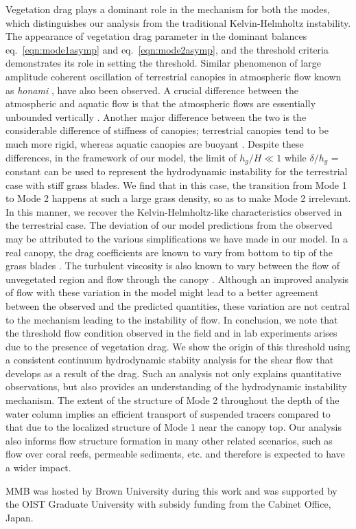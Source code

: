 \documentclass[aps,prl,twocolumn,superscriptaddress,10pt]{revtex4-1}  %
\newcommand{\hg}{h_g}
\begin{document}
Vegetation drag plays a dominant role in the mechanism for both the modes, which distinguishes our analysis from the traditional Kelvin-Helmholtz instability. 
The appearance of vegetation drag parameter in the dominant balances eq.~\eqref{eqn:mode1asymp} and eq.~\eqref{eqn:mode2asymp}, and the threshold criteria demonstrates its role in setting the threshold.
\newline
Similar phenomenon of large amplitude coherent oscillation of terrestrial canopies in atmospheric flow known as \textit{honami} \cite{Inoue56,Raupach96}, have also been observed.
A crucial difference between the atmospheric and aquatic flow is that the atmospheric flows are essentially unbounded vertically \cite{Vivoni98,Nepf00}. 
Another major difference between the two is the considerable difference of stiffness of canopies; terrestrial canopies tend to be much more rigid, whereas aquatic canopies are buoyant \cite{Vivoni98,Ghisal02}. 
Despite these differences, in the framework of our model, the limit of $\hg/H \ll 1$ while $\delta/\hg$ = constant can be used to represent the hydrodynamic instability for the terrestrial case with stiff grass blades. We find that in this case, the transition from Mode 1 to Mode 2 happens at such a large grass density, so as to make Mode 2 irrelevant. In this manner, we recover the Kelvin-Helmholtz-like characteristics observed in the terrestrial case. 
\newline
The deviation of our model predictions from the observed may be attributed to the various simplifications we have made in our model. 
In a real canopy, the drag coefficients are known to vary from bottom to tip of the grass blades \cite{Vivoni98,Nepf00}. 
The turbulent viscosity is also known to vary between the flow of unvegetated region and flow through the canopy \cite{Ghisal02}. 
Although an improved analysis of flow with these variation in the model might lead to a better agreement between the observed and the predicted quantities, these variation are not central to the mechanism leading to the instability of flow.
\newline\newline
In conclusion, we note that the threshold flow condition observed in the field and in lab experiments arises due to the presence of vegetation drag. 
We show the origin of this threshold using a consistent continuum hydrodynamic stabiity analysis for the shear flow that develops as a result of the drag. 
Such an analysis not only explains quantitative observations, but also provides an understanding of the hydrodynamic instability mechanism. 
The extent of the structure of Mode 2 throughout the depth of the water column implies an efficient transport of suspended tracers compared to that due to the localized structure of Mode 1 near the canopy top. 
Our analysis also informs flow structure formation in many other related scenarios, such as flow over coral reefs, permeable sediments, etc. and therefore is expected to have a wider impact.

\acknowledgments
MMB was hosted by Brown University during this work and was supported by the OIST Graduate University with subsidy funding from the Cabinet Office, Japan.

{}

\end{document}
